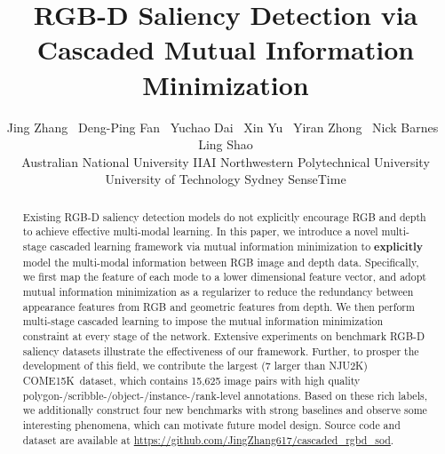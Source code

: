 \documentclass[10pt,twocolumn,letterpaper]{article}
\def\ourdataset{COME15K}
\begin{document}
\title{RGB-D Saliency Detection via Cascaded Mutual Information Minimization}

\author{
Jing Zhang~
Deng-Ping Fan~
Yuchao Dai~
Xin Yu~ 
Yiran Zhong~ 
Nick Barnes~ 
Ling Shao\\
 Australian National University\quad
 IIAI\quad
 Northwestern Polytechnical University\\
 University of Technology Sydney\quad
 SenseTime\\
}

\maketitle
\ificcvfinal\thispagestyle{empty}\fi

\begin{abstract}
Existing RGB-D saliency detection models do not explicitly encourage RGB and depth to achieve effective multi-modal learning. In this paper, we introduce a novel multi-stage cascaded learning framework via mutual information minimization to \textbf{explicitly} model the multi-modal information between RGB image and depth data. Specifically, we first map the feature of each mode to a lower dimensional feature vector, and adopt mutual information minimization as a regularizer to reduce the redundancy between appearance features from RGB and geometric features from depth. We then perform multi-stage cascaded learning to impose the mutual information minimization constraint at every stage of the network. Extensive experiments on benchmark RGB-D saliency datasets illustrate the effectiveness of our framework. Further, to prosper the development of this field, 
we contribute the largest (7 larger than NJU2K) \ourdataset~dataset, which contains 15,625 image pairs with
high quality polygon-/scribble-/object-/instance-/rank-level annotations. Based on these rich labels, we additionally construct four new benchmarks
with strong baselines and observe some interesting phenomena, which can motivate future model design. Source code and dataset are available at \url{https://github.com/JingZhang617/cascaded_rgbd_sod}.
\end{abstract}
\end{document}
